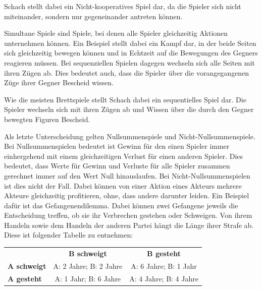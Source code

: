 
Schach stellt dabei ein Nicht-kooperatives Spiel dar, da die Spieler sich nicht miteinander, sondern nur gegeneinander antreten können.

Simultane Spiele sind Spiele, bei denen alle Spieler gleichzeitig Aktionen unternehmen können. Ein Beispiel stellt dabei ein Kampf dar, in der beide Seiten sich gleichzeitig bewegen können und in Echtzeit auf die Bewegungen des Gegners reagieren müssen. Bei sequenziellen Spielen dagegen wechseln sich alle Seiten mit ihren Zügen ab. Dies bedeutet auch, dass die Spieler über die vorangegangenen Züge ihrer Gegner Bescheid wissen. \cite{Rodriguez}

Wie die meisten Brettspiele stellt Schach dabei ein sequentielles Spiel dar. Die Spieler wechseln sich mit ihren Zügen ab und Wissen über die durch den Gegner bewegten Figuren Bescheid.

Als letzte Unterscheidung gelten Nullsummenspiele und Nicht-Nullsummenspiele. Bei Nullsummenspielen bedeutet ist Gewinn für den einen Spieler immer einhergehend mit einem gleichzeitigen Verlust für einen anderen Spieler. Dies bedeutet, dass Werte für Gewinn und Verluste für alle Spieler zusammen gerechnet immer auf den Wert Null hinauslaufen. Bei Nicht-Nullsummenspielen ist dies nicht der Fall. Dabei können von einer Aktion eines Akteurs mehrere Akteure gleichzeitig profitieren, ohne, dass andere darunter leiden.\cite{Rodriguez} Ein Beispiel dafür ist das Gefangenendilemma. Dabei können zwei Gefangene jeweils die Entscheidung treffen, ob sie ihr Verbrechen gestehen oder Schweigen. Von ihrem Handeln sowie dem Handeln der anderen Partei hängt die Länge ihrer Strafe ab. \cite{Tweedale1993} Diese ist folgender Tabelle zu entnehmen:

\begin{tabular}{l c c}
& \textbf{B schweigt} & \textbf{B gesteht} \\
\textbf{A schweigt} & A: 2 Jahre; B: 2 Jahre & A: 6 Jahre; B: 1 Jahr \\
\textbf{A gesteht} & A: 1 Jahr; B: 6 Jahre & A: 4 Jahre; B: 4 Jahre
\end{tabular}


